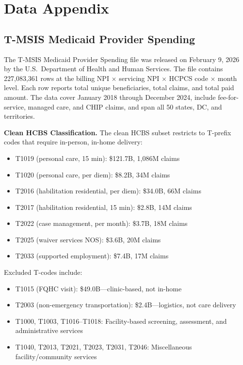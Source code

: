 \documentclass[12pt]{article}
\begin{document}
\section{Data Appendix}
\label{app:data}

\subsection{T-MSIS Medicaid Provider Spending}

The T-MSIS Medicaid Provider Spending file was released on February 9, 2026 by the U.S.\ Department of Health and Human Services. The file contains 227,083,361 rows at the billing NPI $\times$ servicing NPI $\times$ HCPCS code $\times$ month level. Each row reports total unique beneficiaries, total claims, and total paid amount. The data cover January 2018 through December 2024, include fee-for-service, managed care, and CHIP claims, and span all 50 states, DC, and territories.

\textbf{Clean HCBS Classification.} The clean HCBS subset restricts to T-prefix codes that require in-person, in-home delivery:
\begin{itemize}
\item T1019 (personal care, 15 min): \$121.7B, 1,086M claims
\item T1020 (personal care, per diem): \$8.2B, 34M claims
\item T2016 (habilitation residential, per diem): \$34.0B, 66M claims
\item T2017 (habilitation residential, 15 min): \$2.8B, 14M claims
\item T2022 (case management, per month): \$3.7B, 18M claims
\item T2025 (waiver services NOS): \$3.6B, 20M claims
\item T2033 (supported employment): \$7.4B, 17M claims
\end{itemize}

\noindent Excluded T-codes include:
\begin{itemize}
\item T1015 (FQHC visit): \$49.0B---clinic-based, not in-home
\item T2003 (non-emergency transportation): \$2.4B---logistics, not care delivery
\item T1000, T1003, T1016--T1018: Facility-based screening, assessment, and administrative services
\item T1040, T2013, T2021, T2023, T2031, T2046: Miscellaneous facility/community services
\end{itemize}
\end{document}
